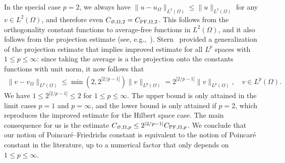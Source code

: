 \documentclass[a4paper]{article}
\begin{document}
In the special case $p=2$, we always have $\| u - u_\Omega \|_{L^{2}(\Omega)} \leq \| u \|_{L^{2}(\Omega)}$ for any $v \in L^{2}(\Omega)$,
and therefore even $C_{\varnothing,\Omega,2} = C_{{\rm PF},\Omega,2}$. 
This follows from the orthogonality constant functions to average-free functions in $L^2(\Omega)$,
and it also follows from the projection estimate (see, e.g.,~\cite{xu2003some}).
Stern~\cite{stern2015banach} provided a generalization of the projection estimate that implies improved estimate for all $L^p$ spaces with $1 \leq p \leq \infty$:
since taking the average is a the projection onto the constants functions with unit norm, it now follows that 
\begin{align*}
    \| v - v_\Omega \|_{L^{p}(\Omega)}
    \leq 
    \min\left( 2, 2^{|2/p-1|} \right)
    \| v \|_{L^{p}(\Omega)}
    = 
    2^{|2/p-1|} 
    \| v \|_{L^{p}(\Omega)}
    ,
    \quad 
    v \in L^p(\Omega)
    .
\end{align*}
We have $1 \leq 2^{|2/p-1|} \leq 2$ for $1 \leq p \leq \infty$.
The upper bound is only attained in the limit cases $p = 1$ and $p = \infty$, and the lower bound is only attained if $p = 2$, which reproduces the improved estimate for the Hilbert space case.
The main consequence for us is the estimate 
$C_{\varnothing,\Omega,p} \leq 2^{|2/p-1|} C_{{\rm PF},\Omega,p}$.
We conclude that our notion of Poincar\'e--Friedrichs constant is equivalent to the notion of Poincar\'e constant in the literature, up to a numerical factor that only depends on $1 \leq p \leq \infty$.
\end{document}
